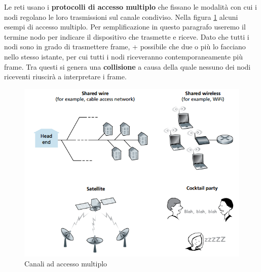 \documentclass[11pt,a4paper]{article}
\begin{document}
Le reti usano i \textbf{protocolli di accesso multiplo} che fissano le modalità con cui i nodi regolano le loro trasmissioni sul canale condiviso. Nella figura \ref{fig: 076} alcuni esempi di accesso multiplo. Per semplificazione in questo paragrafo useremo il termine nodo per indicare il dispositivo che trasmette e riceve. Dato che tutti i nodi sono in grado di trasmettere frame, + possibile che due o più lo facciano nello stesso istante, per cui tutti i nodi riceveranno contemporaneamente più frame. Tra questi si genera una \textbf{collisione} a causa della quale nessuno dei nodi riceventi riuscirà a interpretare i frame.

\begin{figure}
	\begin{center}
		\includegraphics[scale=0.6]{img/076.png}
		\caption{Canali ad accesso multiplo}
		\label{fig: 076}
	\end{center}
\end{figure}
\end{document}
